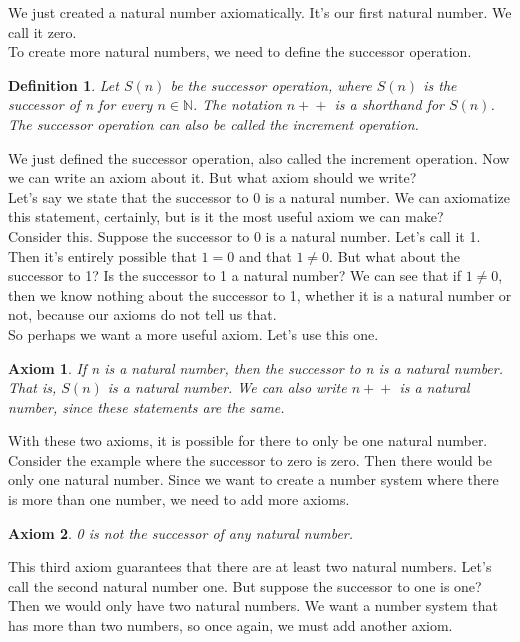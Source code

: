 \documentclass{article}
\newtheorem{axiom}{Axiom}
\newtheorem{definition}{Definition}
\newcommand{\inc}[1]{#1\!+\!+}
\begin{document}
We just created a natural number axiomatically. It's our first natural number. We call it zero. \\

To create more natural numbers, we need to define the successor operation.

\begin{definition}
Let $S(n)$ be the successor operation, where $S(n)$ is the successor of n for every $n \in \mathbb{N}$. The notation $\inc{n}$ is a shorthand for $S(n)$. The successor operation can also be called the increment operation.
\end{definition}

We just defined the successor operation, also called the increment operation. Now we can write an axiom about it. But what axiom should we write? \\

Let's say we state that the successor to 0 is a natural number. We can axiomatize this statement, certainly, but is it the most useful axiom we can make? \\

Consider this. Suppose the successor to 0 is a natural number. Let's call it 1. Then it's entirely possible that $1 = 0$ and that $1 \neq 0$. But what about the successor to 1? Is the successor to 1 a natural number? We can see that if $1 \neq 0$, then we know nothing about the successor to 1, whether it is a natural number or not, because our axioms do not tell us that. \\

So perhaps we want a more useful axiom. Let's use this one. 

\begin{axiom}
If n is a natural number, then the successor to n is a natural number. That is, $S(n)$ is a natural number. We can also write $\inc{n}$ is a natural number, since these statements are the same.
\end{axiom}

With these two axioms, it is possible for there to only be one natural number. Consider the example where the successor to zero is zero. Then there would be only one natural number. Since we want to create a number system where there is more than one number, we need to add more axioms.

\begin{axiom}
0 is not the successor of any natural number.
\end{axiom}

This third axiom guarantees that there are at least two natural numbers. Let's call the second natural number one. But suppose the successor to one is one? Then we would only have two natural numbers. We want a number system that has more than two numbers, so once again, we must add another axiom.
\end{document}
